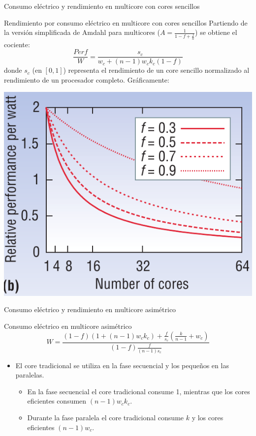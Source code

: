 \documentclass[utf8]{beamer}
\begin{document}
\begin{frame}{Consumo eléctrico y rendimiento en multicore con cores sencillos}
    \small
    \begin{block}{Rendimiento por consumo eléctrico en multicore con cores sencillos}
        Partiendo de la versión simplificada de Amdahl para multicores ($ A = \frac{1}{1 - f + \frac{f}{n}} $) se obtiene el cociente:
            $$ \frac{Perf}{W} = \frac{s_{c}}{w_{c} + (n - 1)w_{c}k_{c}(1-f)} $$
        donde $ s_{c} $ (en $ [0,1] $) representa el rendimiento de un core sencillo normalizado al rendimiento de un procesador completo. 
        Gráficamente:    
    \end{block}    
    \begin{center}
        \includegraphics[width=.25\linewidth]{figures/am_powperf_b}    
    \end{center}
\end{frame}


\begin{frame}{Consumo eléctrico y rendimiento en multicore asimétrico}
    \begin{block}{Consumo eléctrico en multicore asimétrico}
        $$ W = \frac{(1 -f)(1+(n-1)w_{c}k_{c}) + \frac{f}{s_{c}} (\frac{k}{n-1} + w_{c})}{(1 - f)\frac{f}{(n-1)s_{c}}} $$
        \begin{itemize}
             \item El core tradicional se utiliza en la fase secuencial y los pequeños en las paralelas.
             \begin{itemize}
                \item En la fase secuencial el core tradicional consume 1, mientras que los cores eficientes consumen $ (n-1)w_{c}k_{c} $.
                \item Durante la fase paralela el core tradicional consume $ k $ y los cores eficientes $ (n-1)w_{c} $.
             \end{itemize}
        \end{itemize}
    \end{block}
\end{frame}
\end{document}
